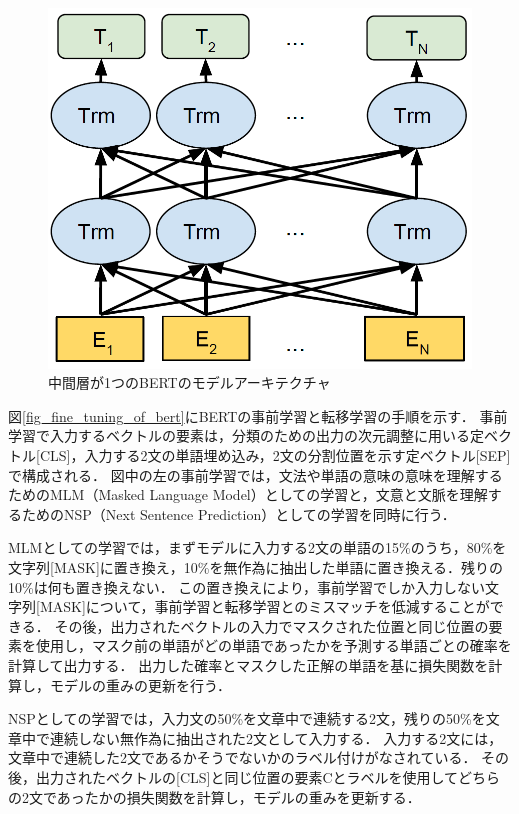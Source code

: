 \documentclass[12pt,a4j]{jreport}
\begin{document}
\begin{figure}[H]
  \centering
  \includegraphics[keepaspectratio, width=120mm]{img/bert.png}
  \caption{中間層が1つのBERTのモデルアーキテクチャ\protect\footnotemark[4]}
  \label{fig_bert}
\end{figure}

図\ref{fig_fine_tuning_of_bert}にBERTの事前学習と転移学習の手順を示す．
事前学習で入力するベクトルの要素は，分類のための出力の次元調整に用いる定ベクトル[CLS]，入力する2文の単語埋め込み，2文の分割位置を示す定ベクトル[SEP]で構成される．
図中の左の事前学習では，文法や単語の意味の意味を理解するためのMLM（Masked Language Model）としての学習と，文意と文脈を理解するためのNSP（Next Sentence Prediction）としての学習を同時に行う．

MLMとしての学習では，まずモデルに入力する2文の単語の15\%のうち，80\%を文字列[MASK]に置き換え，10\%を無作為に抽出した単語に置き換える．残りの10\%は何も置き換えない．
この置き換えにより，事前学習でしか入力しない文字列[MASK]について，事前学習と転移学習とのミスマッチを低減することができる．
その後，出力されたベクトルの入力でマスクされた位置と同じ位置の要素を使用し，マスク前の単語がどの単語であったかを予測する単語ごとの確率を計算して出力する．
出力した確率とマスクした正解の単語を基に損失関数を計算し，モデルの重みの更新を行う．

NSPとしての学習では，入力文の50\%を文章中で連続する2文，残りの50\%を文章中で連続しない無作為に抽出された2文として入力する．
入力する2文には，文章中で連続した2文であるかそうでないかのラベル付けがなされている．
その後，出力されたベクトルの[CLS]と同じ位置の要素Cとラベルを使用してどちらの2文であったかの損失関数を計算し，モデルの重みを更新する．
\end{document}
